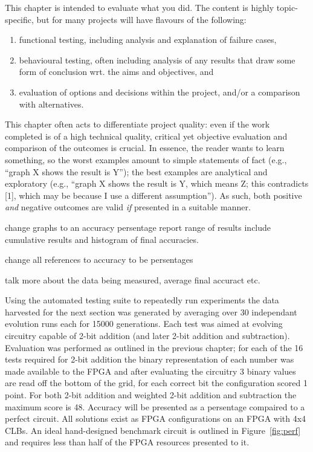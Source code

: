 \noindent
{
\color{red}
This chapter is intended to evaluate what you did.  The content is highly
topic-specific, but for many projects will have flavours of the following:

\begin{enumerate}
\item functional  testing, including analysis and explanation of failure
      cases,
\item behavioural testing, often including analysis of any results that
      draw some form of conclusion wrt. the aims and objectives,
      and
\item evaluation of options and decisions within the project, and/or a
      comparison with alternatives.
\end{enumerate}

\noindent
This chapter often acts to differentiate project quality: even if the work
completed is of a high technical quality, critical yet objective evaluation
and comparison of the outcomes is crucial.  In essence, the reader wants to
learn something, so the worst examples amount to simple statements of fact
(e.g., ``graph X shows the result is Y''); the best examples are analytical
and exploratory (e.g., ``graph X shows the result is Y, which means Z; this
contradicts [1], which may be because I use a different assumption'').  As
such, both positive {\em and} negative outcomes are valid {\em if} presented
in a suitable manner.
}

\todo change graphs to an accuracy persentage report range of results include cumulative
results and histogram of final accuracies.

\todo change all references to accuracy to be persentages

\todo talk more about the data being measured, average final accuract etc.

Using the automated testing suite to repeatedly run experiments the data
harvested for the next section
was generated by averaging over 30 independant evolution runs
each for 15000 generations. Each test was aimed at evolving circuitry
capable of 2-bit addition (and later 2-bit addition and subtraction). Evaluation
was performed as outlined in the previous chapter; for each of the 16 tests required
for 2-bit addition the binary representation of each number was made available
to the FPGA and after evaluating the circuitry 3 binary values are read off
the bottom of the grid, for each
correct bit the configuration scored 1 point. For both 2-bit addition and weighted 2-bit
addition and subtraction the maximum score is 48. Accuracy will be presented
as a persentage compaired to a perfect circuit. All solutions exist as FPGA configurations
on an FPGA with 4x4 CLBs. An ideal hand-designed benchmark circuit is outlined
in Figure~\ref{fig:perf} and requires less than half of the FPGA resources presented to it.

